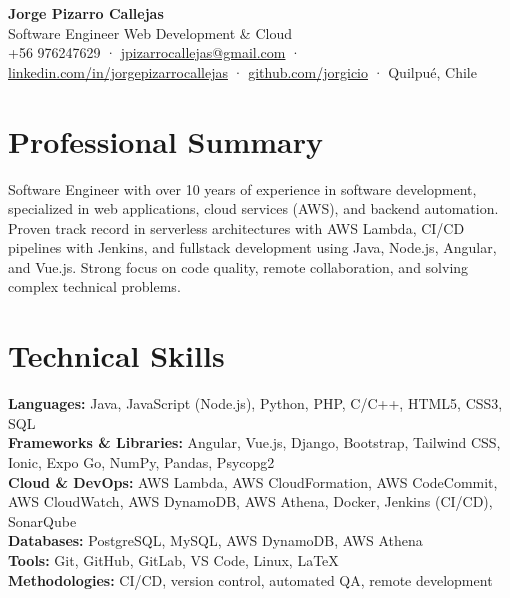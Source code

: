 \documentclass[11pt, a4paper]{article}
\newcommand{\skill}[2]{%
  \textbf{#1:} #2 \\[2pt]
}
\begin{document}
 
\begin{center}
  {\Huge\bfseries\color{azulcv} Jorge Pizarro Callejas} \\[6pt]
  {\large\color{gris} Software Engineer \textbar{} Web Development \& Cloud} \\[6pt]
  {\small\color{gris}
    +56 976247629 \;·\;
    \href{mailto:jpizarrocallejas@gmail.com}{jpizarrocallejas@gmail.com} \;·\;
    \href{https://linkedin.com/in/jorgepizarrocallejas}{linkedin.com/in/jorgepizarrocallejas} \;·\;
    \href{https://github.com/jorgicio}{github.com/jorgicio} \;·\;
    Quilpu\'e, Chile
  }
\end{center}
 
\vspace{4pt}
 
\section{Professional Summary}
 
Software Engineer with over 10 years of experience in software development, specialized in
web applications, cloud services (AWS), and backend automation. Proven track record in
serverless architectures with AWS Lambda, CI/CD pipelines with Jenkins, and fullstack
development using Java, Node.js, Angular, and Vue.js. Strong focus on code quality,
remote collaboration, and solving complex technical problems.
 
\section{Technical Skills}
 
\skill{Languages}{Java, JavaScript (Node.js), Python, PHP, C/C++, HTML5, CSS3, SQL}
\skill{Frameworks \& Libraries}{Angular, Vue.js, Django, Bootstrap, Tailwind CSS, Ionic, Expo Go, NumPy, Pandas, Psycopg2}
\skill{Cloud \& DevOps}{AWS Lambda, AWS CloudFormation, AWS CodeCommit, AWS CloudWatch, AWS DynamoDB, AWS Athena, Docker, Jenkins (CI/CD), SonarQube}
\skill{Databases}{PostgreSQL, MySQL, AWS DynamoDB, AWS Athena}
\skill{Tools}{Git, GitHub, GitLab, VS Code, Linux, \LaTeX}
\skill{Methodologies}{CI/CD, version control, automated QA, remote development}
 
\end{document}
